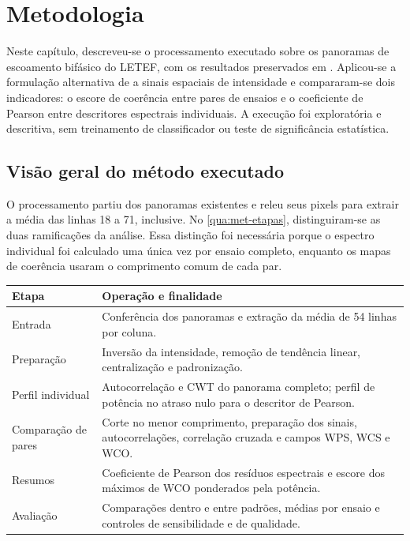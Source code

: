 \chapter{Metodologia}\label{cap:metodologia}

Neste capítulo, descreveu-se o processamento executado sobre os panoramas de escoamento
bifásico do LETEF, com os resultados preservados em
. Aplicou-se a formulação alternativa de
 a sinais espaciais de intensidade e compararam-se dois
indicadores: o escore de coerência entre pares de ensaios e o coeficiente de Pearson
entre descritores espectrais individuais. A execução foi exploratória e descritiva,
sem treinamento de classificador ou teste de significância estatística.

\section{Visão geral do método executado}\label{sec:met-visao}

O processamento partiu dos panoramas existentes e releu seus pixels para extrair a
média das linhas 18 a 71, inclusive. No \autoref{qua:met-etapas}, distinguiram-se as duas
ramificações da análise. Essa distinção foi necessária porque o espectro individual
foi calculado uma única vez por ensaio completo, enquanto os mapas de coerência
usaram o comprimento comum de cada par.

\begin{quadro}[htb]
  \centering
  \caption{Etapas do processamento efetivamente executado.}
  \label{qua:met-etapas}
  \begin{tabular}{p{3.1cm}p{10.5cm}}
    \hline
    \textbf{Etapa} & \textbf{Operação e finalidade} \\
    \hline
    Entrada & Conferência dos panoramas e extração da média de 54 linhas por coluna. \\
    Preparação & Inversão da intensidade, remoção de tendência linear, centralização e padronização. \\
    Perfil individual & Autocorrelação e CWT do panorama completo; perfil de potência no atraso nulo para o descritor de Pearson. \\
    Comparação de pares & Corte no menor comprimento, preparação dos sinais, autocorrelações, correlação cruzada e campos WPS, WCS e WCO. \\
    Resumos & Coeficiente de Pearson dos resíduos espectrais e escore dos máximos de WCO ponderados pela potência. \\
    Avaliação & Comparações dentro e entre padrões, médias por ensaio e controles de sensibilidade e de qualidade. \\
    \hline
  \end{tabular}
\end{quadro}

